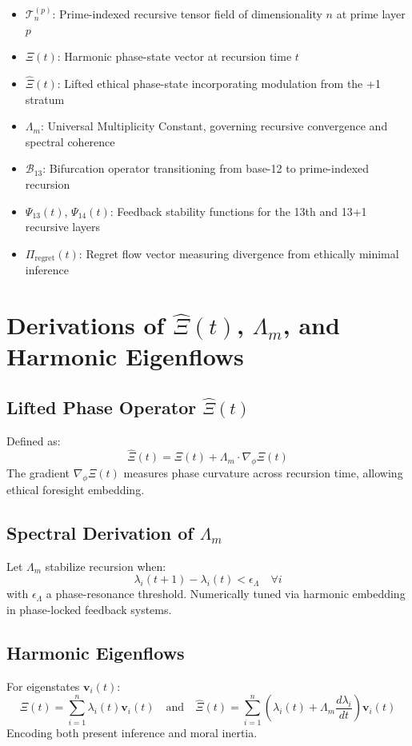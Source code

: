 \documentclass[12pt]{article}
\begin{document}
\begin{itemize}
    \item $\mathcal{T}_{n}^{(p)}$: Prime-indexed recursive tensor field of dimensionality $n$ at prime layer $p$
    \item $\Xi(t)$: Harmonic phase-state vector at recursion time $t$
    \item $\hat{\Xi}(t)$: Lifted ethical phase-state incorporating modulation from the +1 stratum
    \item $\Lambda_m$: Universal Multiplicity Constant, governing recursive convergence and spectral coherence
    \item $\mathcal{B}_{13}$: Bifurcation operator transitioning from base-12 to prime-indexed recursion
    \item $\Psi_{13}(t)$, $\Psi_{14}(t)$: Feedback stability functions for the 13th and 13+1 recursive layers
    \item $\Pi_{\text{regret}}(t)$: Regret flow vector measuring divergence from ethically minimal inference
\end{itemize}

\section{Derivations of $\hat{\Xi}(t)$, $\Lambda_m$, and Harmonic Eigenflows}

\subsection*{Lifted Phase Operator $\hat{\Xi}(t)$}
Defined as:
\[
\hat{\Xi}(t) = \Xi(t) + \Lambda_m \cdot \nabla_\phi \Xi(t)
\]
The gradient $\nabla_\phi \Xi(t)$ measures phase curvature across recursion time, allowing ethical foresight embedding.

\subsection*{Spectral Derivation of $\Lambda_m$}
Let $\Lambda_m$ stabilize recursion when:
\[
\lambda_i(t+1) - \lambda_i(t) < \epsilon_\Lambda \quad \forall i
\]
with $\epsilon_\Lambda$ a phase-resonance threshold. Numerically tuned via harmonic embedding in phase-locked feedback systems.

\subsection*{Harmonic Eigenflows}
For eigenstates $\mathbf{v}_i(t)$:
\[
\Xi(t) = \sum_{i=1}^n \lambda_i(t) \mathbf{v}_i(t)
\quad\text{and}\quad
\hat{\Xi}(t) = \sum_{i=1}^n \left( \lambda_i(t) + \Lambda_m \frac{d\lambda_i}{dt} \right) \mathbf{v}_i(t)
\]
Encoding both present inference and moral inertia.
\end{document}
